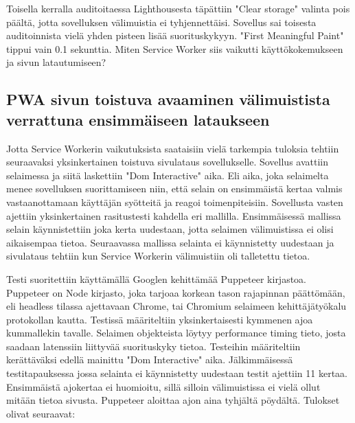 \documentclass{tktltiki}
\begin{document}
Toisella kerralla auditoitaessa Lighthousesta täpättiin "Clear storage" valinta pois päältä, jotta sovelluksen välimuistia ei tyhjennettäisi. Sovellus sai toisesta auditoinnista vielä yhden pisteen lisää suorituskykyyn. "First Meaningful Paint" tippui vain 0.1 sekunttia. Miten Service Worker siis vaikutti käyttökokemukseen ja sivun latautumiseen?

\subsection{PWA sivun toistuva avaaminen välimuistista verrattuna ensimmäiseen lataukseen}

Jotta Service Workerin vaikutuksista saataisiin vielä tarkempia tuloksia tehtiin seuraavaksi yksinkertainen toistuva sivulataus sovellukselle. Sovellus avattiin selaimessa ja siitä laskettiin "Dom Interactive" aika. Eli aika, joka selaimelta menee sovelluksen suorittamiseen niin, että selain on ensimmäistä kertaa valmis vastaanottamaan käyttäjän syötteitä ja reagoi toimenpiteisiin. Sovellusta vasten ajettiin yksinkertainen rasitustesti kahdella eri mallilla. Ensimmäisessä mallissa selain käynnistettiin joka kerta uudestaan, jotta selaimen välimuistissa ei olisi aikaisempaa tietoa. Seuraavassa mallissa selainta ei käynnistetty uudestaan ja sivulataus tehtiin kun Service Workerin välimuistiin oli talletettu tietoa. 

Testi suoritettiin käyttämällä Googlen kehittämää Puppeteer kirjastoa. \cite{Google3} Puppeteer on Node kirjasto, joka tarjoaa korkean tason rajapinnan päättömään, eli headless tilassa ajettavaan Chrome, tai Chromium selaimeen kehittäjätyökalu protokollan kautta. Testissä määriteltiin yksinkertaisesti kymmenen ajoa kummallekin tavalle. Selaimen objekteista löytyy performance timing tieto, josta saadaan latenssiin liittyvää suorituskyky tietoa. Testeihin määriteltiin kerättäväksi edellä mainittu "Dom Interactive" aika. Jälkimmäisessä testitapauksessa jossa selainta ei käynnistetty uudestaan testit ajettiin 11 kertaa. Ensimmäistä ajokertaa ei huomioitu, sillä silloin välimuistissa ei vielä ollut mitään tietoa sivusta. Puppeteer aloittaa ajon aina tyhjältä pöydältä. Tulokset olivat seuraavat:
\end{document}
